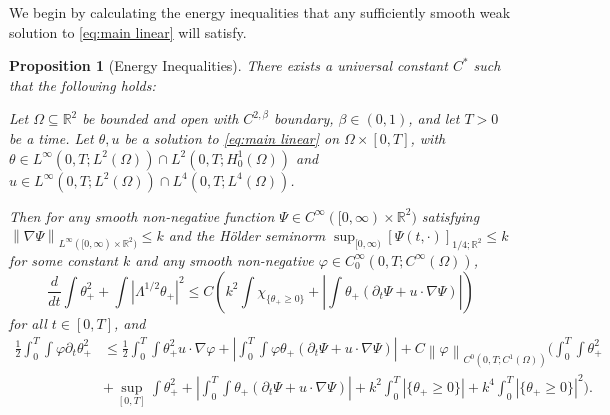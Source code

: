 \documentclass[11pt]{amsart}
\newtheorem{proposition}[theorem]{Proposition}
\theoremstyle{remark}
\theoremstyle{definition}
\newcommand{\R}{\mathbb{R}}
\newcommand{\norm}[1]{\left\lVert#1\right\rVert}
\newcommand{\paren}[1]{\left( #1 \right)}
\newcommand{\bracket}[1]{\left[ #1 \right]}
\newcommand{\abs}[1]{\left\lvert #1 \right\rvert}
\newcommand{\del}{\partial}
\newcommand{\grad}{\nabla}
\newcommand{\ddt}{\frac{d}{dt}}
\newcommand{\indic}[1]{\chi_{\{#1\}}}
\newcommand{\Csuit}{C^\ast}
\begin{document}
We begin by calculating the energy inequalities that any sufficiently smooth weak solution to \eqref{eq:main linear} will satisfy.  
\begin{proposition}[Energy Inequalities] \label{thm:suitability}
There exists a universal constant $\Csuit$ such that the following holds:

Let $\Omega \subseteq \R^2$ be bounded and open with $C^{2,\beta}$ boundary, $\beta \in (0,1)$, and let $T > 0$ be a time.  Let $\theta, u$ be a solution to \eqref{eq:main linear} on $\Omega \times [0,T]$, with $\theta \in L^\infty(0,T; L^2(\Omega)) \cap L^2(0,T; H_0^1(\Omega))$ and $u \in L^\infty(0,T; L^2(\Omega)) \cap L^4(0,T; L^4(\Omega))$.  

Then for any smooth non-negative function $\Psi \in C^\infty([0,\infty)\times \R^2)$ satisfying $\norm{\grad\Psi}_{L^\infty([0,\infty)\times\R^2)} \leq k$ and the H\"{o}lder seminorm $\sup_{[0,\infty)} \bracket{\Psi(t,\cdot)}_{1/4; \R^2} \leq k$ for some constant $k$ and any smooth non-negative $\varphi \in C^\infty_0(0,T;C^\infty(\Omega))$, 
\begin{equation}\label{leray-hopf condition}
\ddt \int \theta_+^2 + \int \abs{\Lambda^{1/2} \theta_+}^2 \leq C \paren{ k^2 \int \indic{\theta_+ \geq 0} + \abs{\int \theta_+ (\del_t \Psi + u\cdot\grad\Psi)} }
\end{equation}
for all $t \in [0,T]$, and
\begin{equation} \label{local condition} \begin{aligned}
\frac{1}{2} \int_0^T\!\!\!\!\int\! \varphi \del_t \theta_+^2 &\leq \frac{1}{2} \int_0^T\!\!\!\!\int\! \theta_+^2 u\!\cdot\!\grad\varphi + \abs{\int_0^T\!\!\!\!\int\! \varphi \theta_+ \paren{\del_t\Psi+u\cdot\grad\Psi}} 
+ C\norm{\varphi}_{C^0(0,T;C^1(\Omega))} \Bigg(\int_0^T\!\!\!\!\int\! \theta_+^2 
\\ & + \sup_{[0,T]} \int\!\! \theta_+^2 + \abs{\int_0^T\!\!\!\!\int\! \theta_+ \paren{\del_t\Psi + u\cdot\grad\Psi}} + k^2 \int_0^T\!\! |\{\theta_+\geq 0\}| + k^4 \int_0^T\!\! |\{\theta_+ \geq 0\}|^2 \Bigg). 
\end{aligned} \end{equation}

\end{proposition}
\end{document}
